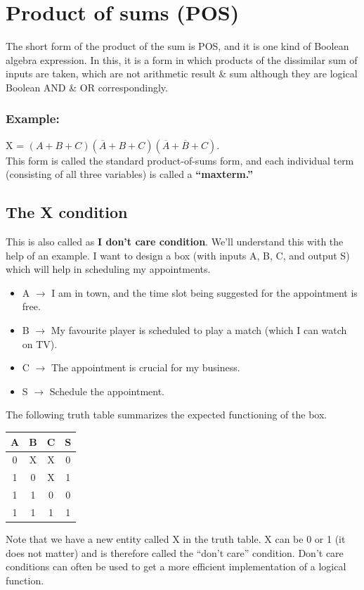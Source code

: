\documentclass{report}
\begin{document}
\section{Product of sums (POS)}
The short form of the product of the sum is POS, and it is one kind of Boolean algebra expression. In this, it is a form in which products of the dissimilar sum of inputs are taken, which are not arithmetic result \& sum although they are logical Boolean AND \& OR correspondingly.
\subsubsection{Example:}
X = $(A + B + C) (\overline{A} + B + C) (\overline{A} + \overline{B} + C)$. \\
This form is called the standard product-of-sums form, and each individual term (consisting of all three variables) is called a \textbf{“maxterm.”}

\subsection{The X condition}
This is also called as \textbf{I don't care condition}. We'll understand this with the help of an example. I want to design a box (with inputs A, B, C, and output S) which will help in scheduling my appointments.
\begin{itemize}
    \item A $\rightarrow$ I am in town, and the time slot being suggested for the appointment is free.
    \item B $\rightarrow$ My favourite player is scheduled to play a match (which I can watch on TV).
    \item C $\rightarrow$ The appointment is crucial for my business.
    \item S $\rightarrow$ Schedule the appointment.
\end{itemize}
The following truth table summarizes the expected functioning of the box.
\begin{center}
\begin{tabular}{ |c|c|c|c| } 
 \hline
 A & B & C & S \\ \hline
 0 & X & X & 0 \\ 
 1 & 0 & X & 1 \\ 
 1 & 1 & 0 & 0 \\ 
 1 & 1 & 1 & 1 \\ 
 \hline
\end{tabular}
\end{center}
Note that we have a new entity called X in the truth table. X can be 0 or 1 (it does not matter) and is therefore called the “don’t care” condition. Don’t care conditions can often be used to get a more efficient implementation of a logical function.
\end{document}
